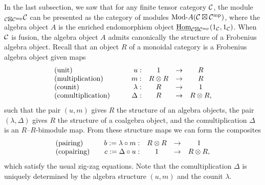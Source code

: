 \documentclass{amsart}
\begin{document}
In the last subsection, we saw that for any finite tensor category $\mathcal C$, the module ${}_{\mathcal C \boxtimes \mathcal C^{\mathrm{mp}}} \mathcal C$ can be presented as the category of modules $\Mod{}{A}(\cC \boxtimes \cC^\mp)$, where the algebra object $A$ is the enriched endomorphism object $\operatorname{\underline{Hom}}_{\mathcal C \boxtimes \mathcal C^{\mathrm{mp}}}(1_\mathcal C,1_\mathcal C)$.  When $\mathcal C$ is fusion, the algebra object $A$ admits canonically the structure of a Frobenius algebra object.  Recall that an object $R$ of a monoidal category is a Frobenius algebra object given maps
\begin{equation*}
	\begin{array}{l c  r c c c}
		\textrm{(unit)} & \quad & u: & 1 & \to & R \\
		\textrm{(multiplication)} && m: & R \otimes R & \to & R \\
		\textrm{(counit)} && \lambda: & R &\to &1 \\
		\textrm{(comultiplication)} && \Delta: & R &\to& R \otimes R,
	\end{array}
\end{equation*}
such that the pair $(u,m)$ gives $R$ the structure of an algebra objects, the pair $(\lambda, \Delta)$ gives $R$ the structure of a coalgebra object, and the comultiplication $\Delta$ is an $R$--$R$-bimodule map.  From these structure maps we can form the composites
\begin{equation*}
	\begin{array}{l c  r c c c}
		\textrm{(pairing)} && b := \lambda \circ m: & R \otimes R& \to& 1 \\
		\textrm{(copairing)} && c := \Delta \circ u: & 1&\to&  R \otimes R,
	\end{array}
\end{equation*}
which satisfy the usual zig-zag equations.  Note that the comultiplication $\Delta$ is uniquely determined by the algebra structure $(u,m)$ and the counit $\lambda$.
\end{document}
